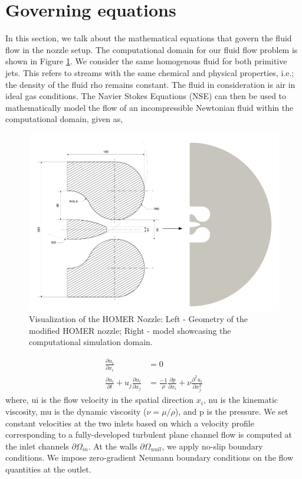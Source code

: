 \section{Governing equations} \label{goveq}
In this section, we talk about the mathematical equations that govern the fluid flow in the nozzle setup. The computational domain for our fluid flow problem is shown in Figure \ref{fig:Domain}. We consider the same homogenous fluid for both primitive jets. This refers to streams with the same chemical and physical properties, i.e.; the density of the fluid \gls{rho} remains constant. The fluid in consideration is air in ideal gas conditions. The Navier Stokes Equations (NSE) can then be used to mathematically model the flow of an incompressible Newtonian fluid within the computational domain, given as, 
\begin{figure}[ht]
  \centering
  \includegraphics[width=12cm]{images/Theory-CFD/Flow Domain.png}
  \caption{Visualization of the HOMER Nozzle: Left - Geometry of the modified HOMER nozzle; Right -  model showcasing the computational simulation domain.}
  \label{fig:Domain}
\end{figure}
\begin{equation}
  \begin{aligned}
  \frac{\partial u_i}{\partial x_i}&=0\\
  \frac{\partial u_i}{\partial t}+u_j \frac{\partial u_i}{\partial x_j}&=\frac{-1}{\rho} \frac{\partial p}{\partial x_i}+\nu \frac{\partial^2 u_i}{\partial x_j^2}
  \end{aligned}
  \end{equation}
where, \gls{ui} is the flow velocity in the spatial direction $x_i$, \gls{nu} is the kinematic viscosity, \gls{mu} is the dynamic viscosity ($\nu = \mu / \rho$), and \gls{p} is the pressure. We set constant velocities at the two inlets based on which a velocity profile corresponding to a fully-developed turbulent plane channel flow is computed at the inlet channels $\partial{\Omega_{in}}$. At the walls $\partial{\Omega_{wall}}$, we apply no-slip boundary conditions. We impose zero-gradient Neumann boundary conditions on the flow quantities at the outlet.\\
